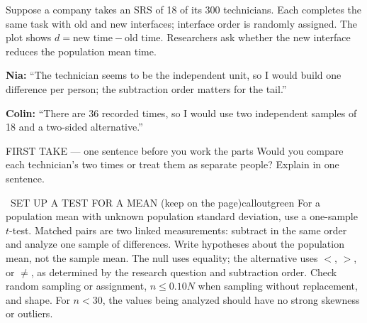 \documentclass[11pt]{article}
\begin{document}


Suppose a company takes an SRS of 18 of its 300 technicians. Each completes the same task with old and new interfaces; interface order is randomly assigned. The plot shows $d=\text{new time}-\text{old time}$. Researchers ask whether the new interface reduces the population mean time.\par\smallskip \textbf{Nia:} ``The technician seems to be the independent unit, so I would build one difference per person; the subtraction order matters for the tail.''\par \textbf{Colin:} ``There are 36 recorded times, so I would use two independent samples of 18 and a two-sided alternative.''\par
\begin{center}
\end{center}
\begin{firsttakebox}{FIRST TAKE --- one sentence before you work the parts}
Would you compare each technician's two times or treat them as separate people? Explain in one sentence.
\workspace{0.9in}
\end{firsttakebox}

\begin{callout}{\IconBook\ SET UP A TEST FOR A MEAN (keep on the page)}{calloutgreen}
For a population mean with unknown population standard deviation, use a one-sample $t$-test.
Matched pairs are two linked measurements: subtract in the same order and analyze one sample of differences.
Write hypotheses about the population mean, not the sample mean. The null uses equality; the alternative
uses $<$, $>$, or $\neq$, as determined by the research question and subtraction order.
Check random sampling or assignment, $n\leq0.10N$ when sampling without replacement, and shape.
For $n<30$, the values being analyzed should have no strong skewness or outliers.
\end{callout}
\end{document}
